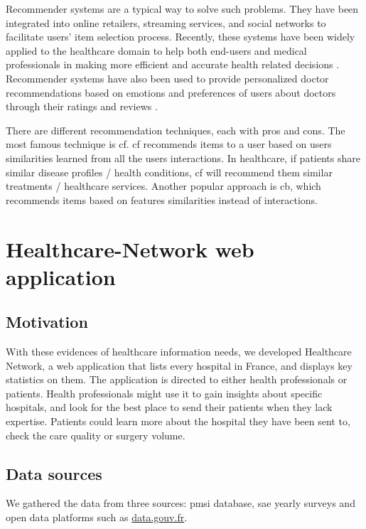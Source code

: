 Recommender systems are a typical way to solve such problems. They have been integrated into online retailers, streaming services, and social networks to facilitate users' item selection process. Recently, these systems have been widely applied to the healthcare domain to help both end-users and medical professionals in making more efficient and accurate health related decisions \cite{tran_recommender_2021}. Recommender systems have also been used to provide personalized doctor recommendations based on emotions and preferences of users about doctors through their ratings and reviews \cite{zhang_idoctor_2017}.

There are different recommendation techniques, each with pros and cons. The most famous technique is \ac{cf}. \ac{cf} recommends items to a user based on users similarities learned from all the users interactions. In healthcare, if patients share similar disease profiles / health conditions, \ac{cf} will recommend them similar treatments / healthcare services. Another popular approach is \ac{cb}, which recommends items based on features similarities instead of interactions.

\section{Healthcare-Network web application}

\subsection{Motivation}

With these evidences of healthcare information needs, we developed Healthcare Network, a web application that lists every hospital in France, and displays key statistics on them. The application is directed to either health professionals or patients. Health professionals might use it to gain insights about specific hospitals, and look for the best place to send their patients when they lack expertise. Patients could learn more about the hospital they have been sent to, check the care quality or surgery volume.

\subsection{Data sources}

We gathered the data from three sources: \ac{pmsi} database, \ac{sae} yearly surveys and open data platforms such as \href{https://data.gouv.fr}{data.gouv.fr}.

